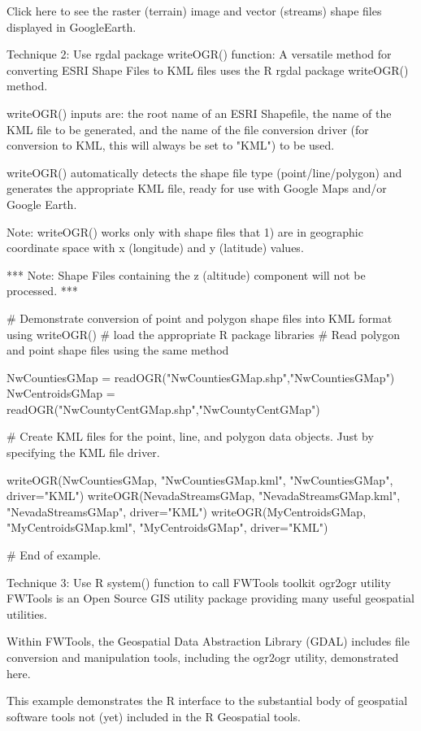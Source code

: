 Click here to see the raster (terrain) image and vector (streams) shape files displayed in GoogleEarth.

Technique 2: Use rgdal package writeOGR() function:
A versatile method for converting ESRI Shape Files to KML files uses the R rgdal package writeOGR() method.

writeOGR() inputs are: the root name of an ESRI Shapefile, the name of the KML file to be generated, and the name of the file conversion driver (for conversion to KML, this will always be set to "KML") to be used.

writeOGR() automatically detects the shape file type (point/line/polygon) and generates the appropriate KML file, ready for use with Google Maps and/or Google Earth.

Note: writeOGR() works only with shape files that 1) are in geographic coordinate space with x (longitude) and y (latitude) values.

*** Note: Shape Files containing the z (altitude) component will not be processed. ***

	
# Demonstrate conversion of point and polygon shape files into KML format using writeOGR()
# load the appropriate R package libraries
# Read polygon and point shape files using the same method

   NwCountiesGMap = readOGR("NwCountiesGMap.shp","NwCountiesGMap")
   NwCentroidsGMap = readOGR("NwCountyCentGMap.shp","NwCountyCentGMap")

# Create KML files for the point, line, and polygon data objects. Just by specifying the KML file driver.

  writeOGR(NwCountiesGMap, "NwCountiesGMap.kml", "NwCountiesGMap", driver="KML")  
  writeOGR(NevadaStreamsGMap, "NevadaStreamsGMap.kml", "NevadaStreamsGMap", driver="KML")
  writeOGR(MyCentroidsGMap, "MyCentroidsGMap.kml", "MyCentroidsGMap", driver="KML")   

# End of example.

Technique 3: Use R system() function to call FWTools toolkit ogr2ogr utility
FWTools is an Open Source GIS utility package providing many useful geospatial utilities.

Within FWTools, the Geospatial Data Abstraction Library (GDAL) includes file conversion and manipulation tools, including the ogr2ogr utility, demonstrated here.

This example demonstrates the R interface to the substantial body of geospatial software tools not (yet) included in the R Geospatial tools.

